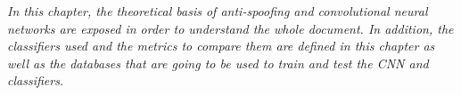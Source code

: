 \minitoc
\mtcskip

\begin{small}
\emph{In this chapter, the theoretical basis of anti-spoofing and convolutional neural networks are exposed in order to understand the whole document. In addition, the classifiers used and the metrics to compare them are defined in this chapter as well as the databases that are going to be used to train and test the CNN and classifiers.}
\end{small} 
  
  
  
  
  
  